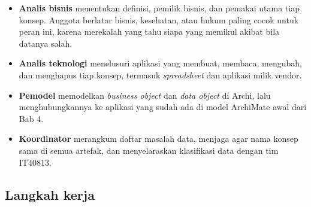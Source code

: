 \begin{itemize}
  \item \textbf{Analis bisnis} menentukan definisi, pemilik bisnis, dan pemakai
        utama tiap konsep. Anggota berlatar bisnis, kesehatan, atau hukum
        paling cocok untuk peran ini, karena merekalah yang tahu siapa yang
        memikul akibat bila datanya salah.
  \item \textbf{Analis teknologi} menelusuri aplikasi yang membuat, membaca,
        mengubah, dan menghapus tiap konsep, termasuk \textit{spreadsheet} dan
        aplikasi milik vendor.
  \item \textbf{Pemodel} memodelkan \textit{business object} dan \textit{data
        object} di Archi, lalu menghubungkannya ke aplikasi yang sudah ada di
        model ArchiMate awal dari Bab 4.
  \item \textbf{Koordinator} merangkum daftar masalah data, menjaga agar nama
        konsep sama di semua artefak, dan menyelaraskan klasifikasi data dengan
        tim IT40813.
\end{itemize}

\subsection*{Langkah kerja}

